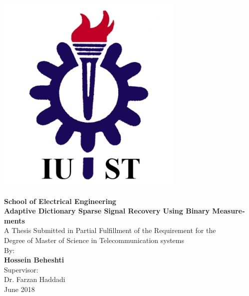 \centerline{\includegraphics[scale=1.3]{./Images/general/IUST_logo_en.png}}
\begin{latin}
\begin{center}
\large
\vspace{-1mm}
\textbf{School of Electrical Engineering}
\\[3cm]
\textbf{Adaptive Dictionary Sparse Signal Recovery Using Binary Measurements}
\\[1.5cm]
A Thesis Submitted in Partial Fulfillment of the Requirement for the 
\\[0.5cm]
Degree of Master of Science in Telecommunication systems 
\\[1cm]
By: 
\\[0.5cm]
\textbf{Hossein Beheshti}
\\[1cm]
Supervisor:
\\[0.5cm]
Dr. Farzan Haddadi
\\[1cm]
June 2018 

\end{center}
\end{latin}